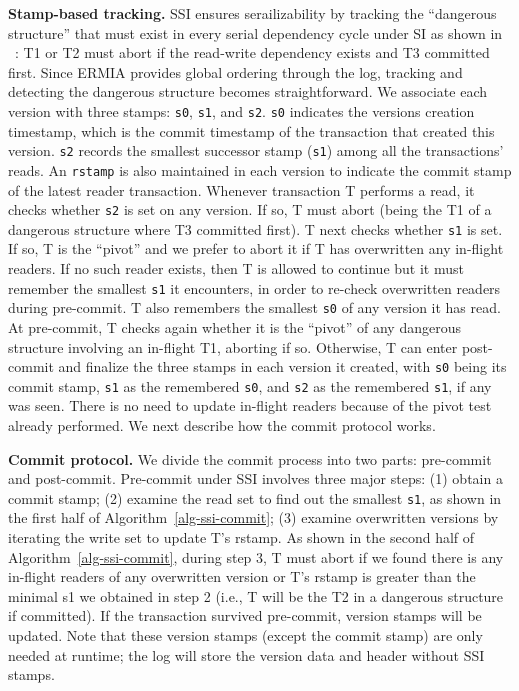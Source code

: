 {\bf Stamp-based tracking.}
SSI ensures serailizability by tracking the ``dangerous structure'' that must exist in every serial dependency cycle under SI as shown in ~\cite{Cahill08RF}: T1 or T2 must abort if the read-write dependency exists and T3 committed first. Since ERMIA provides global ordering through the log, tracking and detecting the dangerous structure becomes straightforward. We associate each version with three stamps: \texttt{s0}, \texttt{s1}, and \texttt{s2}. \texttt{s0} indicates the versions creation timestamp, which is the commit timestamp of the transaction that created this version. \texttt{s2} records the smallest successor stamp (\texttt{s1}) among all the transactions' reads. An \texttt{rstamp} is also maintained in each version to indicate the commit stamp of the latest reader transaction. Whenever transaction T performs a read, it checks whether \texttt{s2} is set on any version. If so, T must abort (being the T1 of a dangerous structure where T3 committed first). T next checks whether \texttt{s1} is set. If so, T is the ``pivot'' and we prefer to abort it if T has overwritten any in-flight readers. If no such reader exists, then T is allowed to continue but it must remember the smallest \texttt{s1} it encounters, in order to re-check overwritten readers during pre-commit. T also remembers the smallest \texttt{s0} of any version it has read. At pre-commit, T checks again whether it is the ``pivot'' of any dangerous structure involving an in-flight T1, aborting if so. Otherwise, T can enter post-commit and finalize the three stamps in each version it created, with \texttt{s0} being its commit stamp, \texttt{s1} as the remembered \texttt{s0}, and \texttt{s2} as the remembered \texttt{s1}, if any was seen. There is no need to update in-flight readers because of the pivot test already performed. We next describe how the commit protocol works.

{\bf Commit protocol.}
We divide the commit process into two parts: pre-commit and post-commit. Pre-commit under SSI involves three major steps: (1) obtain a commit stamp; (2) examine the read set to find out the smallest \texttt{s1}, as shown in the first half of Algorithm~\ref{alg-ssi-commit}; (3) examine overwritten versions by iterating the write set to update T's rstamp. As shown in the second half of Algorithm~\ref{alg-ssi-commit}, during step 3, T must abort if we found there is any in-flight readers of any overwritten version or T's rstamp is greater than the minimal s1 we obtained in step 2 (i.e., T will be the T2 in a dangerous structure if committed). If the transaction survived pre-commit, version stamps will be updated. Note that these version stamps (except the commit stamp) are only needed at runtime; the log will store the version data and header without SSI stamps.

